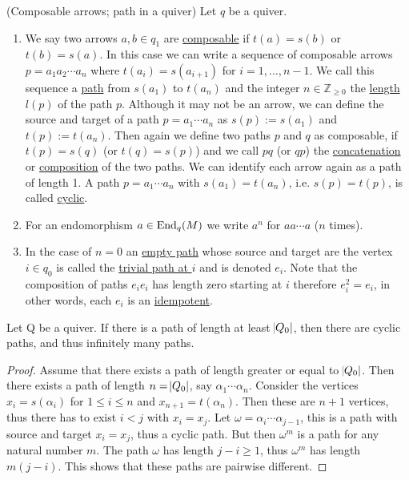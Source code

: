 \begin{definition}{(Composable arrows; path in a quiver)}\label{def:path}
Let $q$ be a quiver.
\begin{enumerate}
\renewcommand{\labelenumi}{(\theenumi)}
\item We say two arrows $a, b \in q_{1}$ are \ul{composable} if $t(a) = s(b)$ or $t(b) = s(a)$. In this case we can write a
sequence of composable arrows $p = a_{1}a_{2}\cdots a_{n}$ where $t(a_{i}) = s(a_{i+1})$ for $i=1,\dots,n-1$.
We call this sequence a \ul{path} from $s(a_{1})$ to $t(a_{n})$ and the integer $n \in \mathbb{Z}_{\geq0}$ the \ul{length} $l(p)$ of the path $p$.
Although it may not be an arrow, we can define the source and target of a path $p = a_{1}\cdots a_{n}$ as $s(p) := s(a_{1})$ and $t(p) := t(a_{n})$.
Then again we define two paths $p$ and $q$ as composable, if $t(p) = s(q)$ (or $t(q) = s(p)$) and we call $pq$ (or $qp$) the \ul{concatenation} or
\ul{composition} of the two paths. We can identify each arrow again as a path of length 1.
A path $p = a_{1}\cdots a_{n}$ with $s(a_{1}) = t(a_{n})$, i.e. $s(p) = t(p)$, is called \ul{cyclic}.
\item For an endomorphism $a \in \textup{End}_{q}(M)$ we write $a^{n}$ for $aa \cdots a$ ($n$ times).
\item In the case of $n=0$ an \ul{empty path} whose source and target are the vertex $i \in q_{0}$ is called the \ul{trivial path at $i$} and
is denoted $e_{i}$. Note that the composition of paths $e_{i}e_{i}$ has length zero starting at $i$ therefore $e_{i}^{2}=e_{i}$,
in other words, each $e_{i}$ is an \ul{idempotent}.
\end{enumerate}
\end{definition}

\begin{lemma}\label{la:cyclic_paths}
Let Q be a quiver. If there is a path of length at least $\abs{Q_{0}}$, then there are cyclic paths,
and thus infinitely many paths.\cite{[leit4]}
\end{lemma}
\begin{proof}
Assume that there exists a path of length greater or equal to $\abs{Q_{0}}$. Then there exists a path of length $n = \abs{Q_{0}}$, say
$\alpha_{1}\cdots \alpha_{n}$. Consider the vertices $x_{i}=s(\alpha_{i})$ for $1 \leq i \leq n$ and $x_{n+1}=t(\alpha_{n})$. Then these
are $n+1$ vertices, thus there has to exist $i<j$ with $x_{i}=x_{j}$. Let $\omega=\alpha_{i}\cdots \alpha_{j-1}$, this is a path with source and target
$x_{i}=x_{j}$, thus a cyclic path. But then $\omega^{m}$ is a path for any natural number $m$. The path $\omega$ has length $j-i\geq1$, thus
$\omega^{m}$ has length $m(j-i)$. This shows that these paths are pairwise different.
\end{proof}

